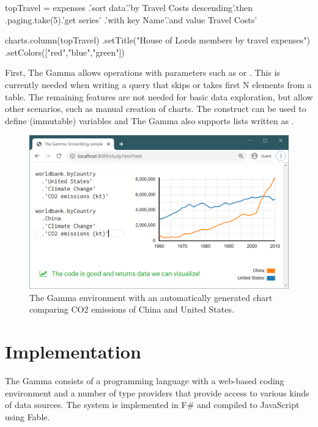 \documentclass[manuscript,review,anonymous]{acmart}
\begin{document}
\begin{thegamma}
 topTravel =
  expenses
    .'sort data'.'by Travel Costs descending'.then
    .paging.take(5).'get series'
    .'with key Name'.'and value Travel Costs'

charts.column(topTravel)
  .setTitle("House of Lords members by travel expenses")
  .setColors(["red","blue","green"])
\end{thegamma}

First, The Gamma allows operations with parameters such as  or .
This is currently needed when writing a query that skips or takes first N elements from a table.
The remaining features are not needed for basic data exploration, but allow other scenarios, such
as manual creation of charts. The  construct can be used to define (immutable) variables
and The Gamma also supports lists written as \ikvd{[1,2,3]}.


\begin{figure}
\includegraphics[width=1\columnwidth]{figures/sidebyside}
\caption{The Gamma environment with an automatically generated chart comparing CO2 emissions
of China and United States.}
\label{fig:sidebyside}
\end{figure}

\section{Implementation}
\label{sec:implementation}
The Gamma consists of a programming language with a web-based coding environment and a number
of type providers that provide access to various kinds of data sources. The system is implemented
in F\# and compiled to JavaScript using Fable.
\end{document}
